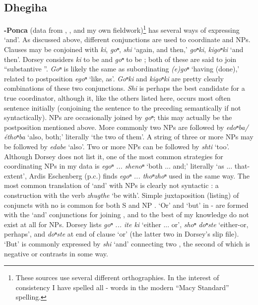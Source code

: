 \documentclass[output=paper]{LSP/langsci}
\begin{document}
\subsection{Dhegiha}
 
\textbf{-Ponca} (data from \citealt{DorseyNDPonka} \citealt{DorseyNDOmahaPonca},  \citealt{Koontz1984}, \citealt{Rudin2003} and my own fieldwork)\footnote{These sources use several different orthographies. In the interest of consistency I have spelled all - words in the modern ``Macy Standard'' spelling.} has several ways of expressing `and'. As discussed above, different conjunctions are used to coordinate  and NPs. Clauses may be conjoined with \textit{ki}, \textit{goⁿ}, \textit{shi} `again, and then,' \textit{goⁿki}, \textit{kigoⁿki} `and then'. Dorsey considers \textit{ki} to be  and \textit{goⁿ} to be ; both of these are said to join ``substantive ''. \textit{Goⁿ} is likely the same as subordinating \textit{(e)goⁿ} `having (done),' related to postposition \textit{egoⁿ} `like, as'. \textit{Goⁿki} and \textit{kigoⁿki} are pretty clearly combinations of these two conjunctions. \textit{Shi} is perhaps the best candidate for a true coordinator, although it, like the others listed here, occurs most often sentence initially (conjoining the sentence to the preceding  semantically if not syntactically). NPs are occasionally joined by \textit{goⁿ}; this may actually be the postposition mentioned above. More commonly two NPs are followed by \textit{edoⁿba/éthoⁿba} `also, both;' literally `the two of them'. A string of three or more NPs may be followed by \textit{edabe} `also'. Two or more NPs can be followed by \textit{shti} `too'. Although Dorsey does not list it, one of the most common strategies for coordinating NPs in my data is \textit{egoⁿ ... shenoⁿ} `both ... and;' literally `as ... that-extent', Ardis Eschenberg (p.c.) finds \textit{egoⁿ ... thoⁿzhoⁿ} used in the same way. The most common translation of `and' with NPs is clearly not syntactic : a  construction with the verb \textit{zhugthe} `be with'. Simple juxtaposition (listing) of conjuncts with no  is common for both S and NP . `Or' and `but' in - are formed with the `and' conjunctions for joining , and to the best of my knowledge do not exist at all for NPs. Dorsey lists \textit{goⁿ ... ite ki} `either ... or', \textit{shoⁿ doⁿste} `either-or, perhaps', and \textit{doⁿste} at end of clause `or' (the latter two in Dorsey's slip file). `But' is commonly expressed by \textit{shi} `and' connecting two , the second of which is negative or contrasts in some way.
\end{document}
